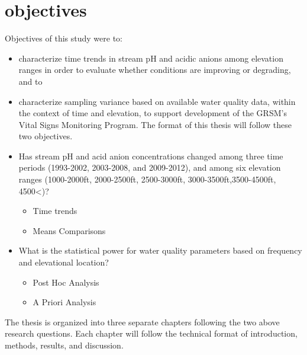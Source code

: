 \section{objectives}
Objectives of this study were to:
\begin{itemize}
\item  characterize time trends in stream pH and acidic anions among elevation ranges in order to evaluate whether conditions are improving or degrading, and to
\item characterize sampling variance based on available water quality data, within the context of time and elevation, to support development of the GRSM’s Vital Signs Monitoring Program.  The format of this thesis will follow these two objectives.  
\end{itemize}
\begin{itemize}
\item Has stream pH and acid anion concentrations changed among three time periods (1993-2002, 2003-2008, and 2009-2012), and among six elevation ranges (1000-2000ft, 2000-2500ft, 2500-3000ft, 3000-3500ft,3500-4500ft, 4500<)?
\begin{itemize}
\item Time trends
 \item Means Comparisons
\end{itemize}
\item What is the statistical power for water quality parameters based on frequency and elevational location?
\begin{itemize}
\item Post Hoc Analysis
\item A Priori Analysis
\end{itemize}
\end{itemize}
The thesis is organized into three separate chapters following the two above research questions. Each chapter will follow the technical format of introduction, methods, results, and discussion. 




